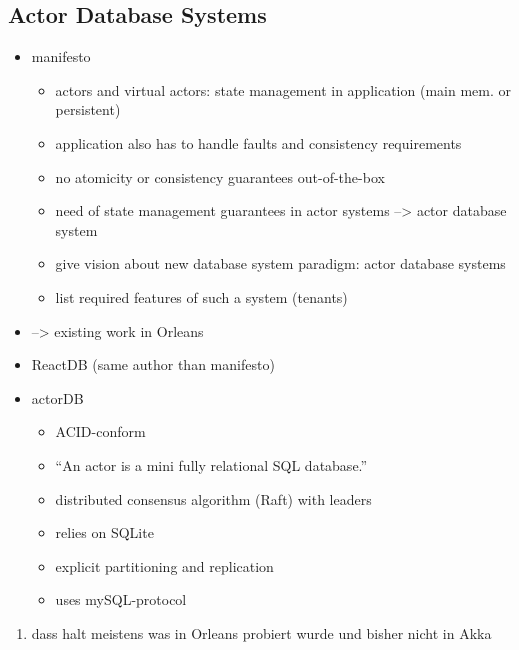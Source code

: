   \subsection{Actor Database Systems}
  \begin{itemize}
    \item manifesto~\cite{manifesto}
      \begin{itemize}
        \item actors and virtual actors: state management in application (main mem. or persistent)
        \item application also has to handle faults and consistency requirements
        \item no atomicity or consistency guarantees out-of-the-box
        \item need of state management guarantees in actor systems --> actor database system
        \item give vision about new database system paradigm: actor database systems
        \item list required features of such a system (tenants)
      \end{itemize}
    \item --> existing work in Orleans
    \item ReactDB (same author than manifesto)~\cite{Shah:reactdb}
    \item actorDB~\cite{biokoda:actordb}
      \begin{itemize}
        \item ACID-conform
        \item \enquote{An actor is a mini fully relational SQL database.}~\cite{biokoda:actordb}
        \item distributed consensus algorithm (Raft) with leaders
        \item relies on SQLite
        \item explicit partitioning and replication
        \item uses mySQL-protocol
      \end{itemize}
  \end{itemize}

\begin{enumerate}
  \item dass halt meistens was in Orleans probiert wurde und bisher nicht in Akka
\end{enumerate}